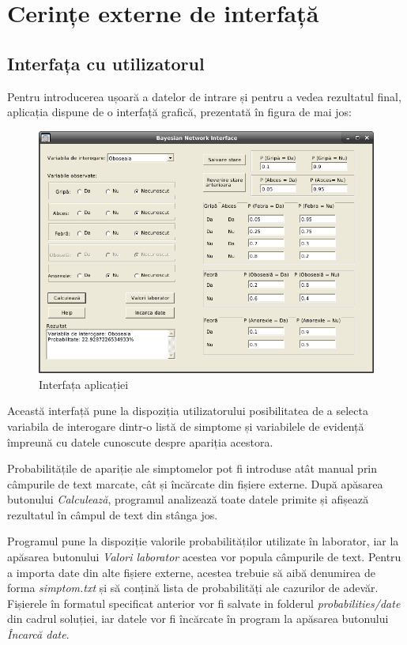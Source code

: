\documentclass{scrreprt}
\begin{document}
\chapter{Cerințe externe de interfață}
\section{Interfața cu utilizatorul}
Pentru introducerea ușoară a datelor de intrare și pentru a vedea rezultatul final, aplicația dispune de o interfață grafică, prezentată în figura de mai jos:

\begin{center}
\begin{figure}[h]
	\includegraphics [scale=0.5] {img/gui.png}
	\caption{Interfața aplicației}
\end{figure}
\end{center}

Această interfață pune la dispoziția utilizatorului posibilitatea de a selecta variabila de interogare dintr-o listă de simptome și variabilele de evidență împreună cu datele cunoscute despre apariția acestora.

Probabilitățile de apariție ale simptomelor pot fi introduse atât manual prin câmpurile de text marcate, cât și încărcate din fișiere externe. După apăsarea butonului \textit{Calculează}, programul analizează toate datele primite și afișează rezultatul în câmpul de text din stânga jos.

Programul pune la dispoziție valorile probabilităților utilizate în laborator, iar la apăsarea butonului \textit{Valori laborator} acestea vor popula câmpurile de text. Pentru a importa date din alte fișiere externe, acestea trebuie să aibă denumirea de forma \textit{simptom.txt} și să conțină lista de probabilități ale cazurilor de adevăr. Fișierele în formatul specificat anterior vor fi salvate in folderul \textit{probabilities/date} din cadrul soluției, iar datele vor fi încărcate în program la apăsarea butonului \textit{Încarcă date}.
\end{document}
